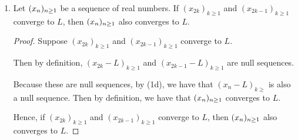 \documentclass[12pt, letterpaper]{article}
\begin{document}
\begin{enumerate}[label=\bfseries1\alph*)]
\begin{proof}
	Set $K = max(K_1, K_2)$ and let $\epsilon > 0$ be given. Then for every 
	$k \geq K$, we have $|x_{2k}| < \epsilon$ and $|x_{2k-1}| < \epsilon$.

	Now set $N=2K$. Then for every $n \geq N$, we have $|x_n| < \epsilon$. 

	Hence, if $(x_{2k})_{k\geq1}$ and $(x_{2k-1})_{k\geq1}$ are null sequences,
	$\seq{x}{n}$ is a null sequence. 
\end{proof}

\item Let $\seq{x}{n}$ be a sequence of real numbers. If $(x_{2k})_{k\geq1}$ and
$(x_{2k-1})_{k\geq1}$ converge to $L$, then $\seq{x}{n}$ also converges to $L$.

\begin{proof}
	Suppose $(x_{2k})_{k\geq1}$ and $(x_{2k-1})_{k\geq1}$ converge to $L$. 

	Then by definition, $(x_{2k} - L)_{k\geq1}$ and $(x_{2k-1} - L)_{k\geq1}$ 
	are null sequences.

	Because these are null sequences, by (1d), we have that $(x_n -L)_{k\geq }$
	is also a null sequence. Then by definition, we have that $\seq{x}{n}$ converges to $L$.

	Hence, if $(x_{2k})_{k\geq1}$ and $(x_{2k-1})_{k\geq1}$ converge to $L$, then 
	$\seq{x}{n}$ also converges to $L$.
\end{proof}
\end{enumerate}
\end{document}
